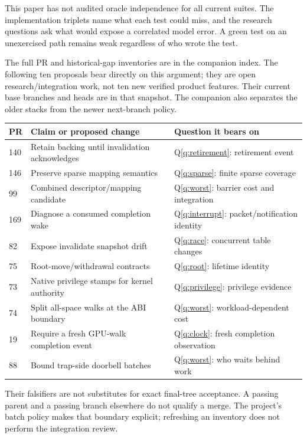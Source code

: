 \unverified This paper has not audited oracle independence for all current suites. The
implementation triplets name what each test could miss, and the research questions ask what
would expose a correlated model error. A green test on an unexercised path remains weak
regardless of who wrote the test.

The full PR and historical-gap inventories are in the companion index. The following ten
proposals bear directly on this argument; they are open research/integration work, not ten
new verified product features. Their current base branches and heads are in that snapshot.
The companion also separates the older stacks from the newer next-branch policy.

\begin{center}\small
\begin{tabularx}{\textwidth}{@{}lXX@{}}
\toprule PR & Claim or proposed change & Question it bears on \\
\midrule
140 & Retain backing until invalidation acknowledges & Q\ref{q:retirement}: retirement event \\
146 & Preserve sparse mapping semantics & Q\ref{q:sparse}: finite sparse coverage \\
99 & Combined descriptor/mapping candidate & Q\ref{q:worst}: barrier cost and integration \\
169 & Diagnose a consumed completion wake & Q\ref{q:interrupt}: packet/notification identity \\
82 & Expose invalidate snapshot drift & Q\ref{q:race}: concurrent table changes \\
75 & Root-move/withdrawal contracts & Q\ref{q:root}: lifetime identity \\
73 & Native privilege stamps for kernel authority & Q\ref{q:privilege}: privilege evidence \\
74 & Split all-space walks at the ABI boundary & Q\ref{q:worst}: workload-dependent cost \\
19 & Require a fresh GPU-walk completion event & Q\ref{q:clock}: fresh completion observation \\
88 & Bound trap-side doorbell batches & Q\ref{q:worst}: who waits behind work \\
\bottomrule
\end{tabularx}
\end{center}

Their falsifiers are not substitutes for exact final-tree acceptance. A passing parent and a
passing branch elsewhere do not qualify a merge. The project's batch policy makes that
boundary explicit; refreshing an inventory does not perform the integration review.
